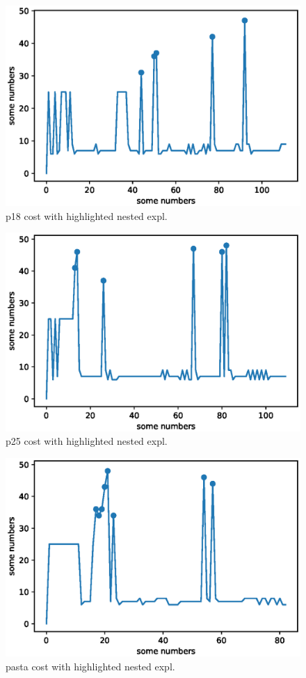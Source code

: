 \begin{figure}[t]
	\centering
	\includegraphics[width=0.5\linewidth]{figures/p18.eps}
	\caption{p18 cost with highlighted nested expl.}
	\label{fig:p18}
	\end{figure}

	\begin{figure}[t]
		\centering
		\includegraphics[width=0.5\linewidth]{figures/p25.eps}
		\caption{p25 cost with highlighted nested expl.}
		\label{fig:p25}
		\end{figure}
		\begin{figure}[t]
			\centering
			\includegraphics[width=0.5\linewidth]{figures/nielspasta-split-nested.eps}
			\caption{pasta cost with highlighted nested expl.}
			\label{fig:pasta}
			\end{figure}